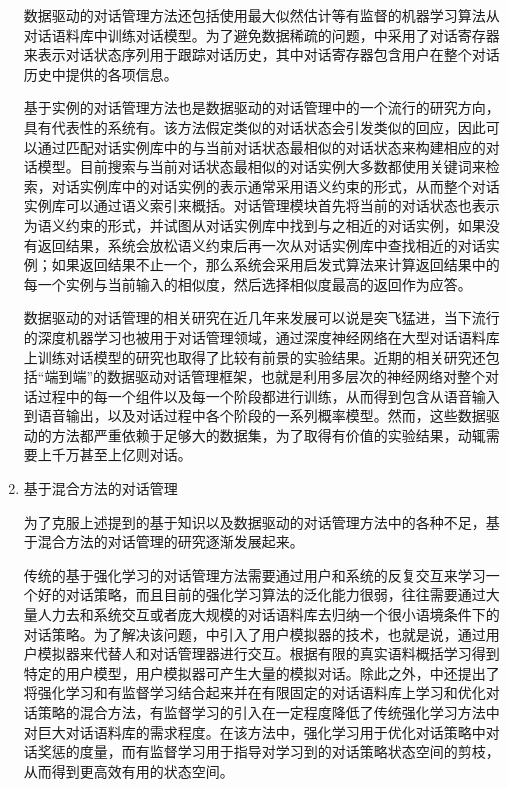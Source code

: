 \begin{enumerate}
数据驱动的对话管理方法还包括使用最大似然估计等有监督的机器学习算法从对话语料库中训练对话模型\cite{Hurtado2005}。为了避免数据稀疏的问题，\cite{Hurtado2005}中采用了对话寄存器来表示对话状态序列用于跟踪对话历史，其中对话寄存器包含用户在整个对话历史中提供的各项信息。

基于实例的对话管理方法也是数据驱动的对话管理中的一个流行的研究方向，具有代表性的系统有\cite{Murao2003, Inui2001, Lee2009c}。该方法假定类似的对话状态会引发类似的回应，因此可以通过匹配对话实例库中的与当前对话状态最相似的对话状态来构建相应的对话模型。目前搜索与当前对话状态最相似的对话实例大多数都使用关键词来检索，对话实例库中的对话实例的表示通常采用语义约束的形式，从而整个对话实例库可以通过语义索引来概括\cite{Lee2009c}。对话管理模块首先将当前的对话状态也表示为语义约束的形式，并试图从对话实例库中找到与之相近的对话实例，如果没有返回结果，系统会放松语义约束后再一次从对话实例库中查找相近的对话实例；如果返回结果不止一个，那么系统会采用启发式算法来计算返回结果中的每一个实例与当前输入的相似度，然后选择相似度最高的返回作为应答。

数据驱动的对话管理的相关研究在近几年来发展可以说是突飞猛进，当下流行的深度机器学习也被用于对话管理领域，通过深度神经网络在大型对话语料库上训练对话模型的研究也取得了比较有前景的实验结果\cite{Shang2015, Sordoni2015b, VinyalsLe2015}。近期的相关研究还包括“端到端”的数据驱动对话管理框架，也就是利用多层次的神经网络对整个对话过程中的每一个组件以及每一个阶段都进行训练，从而得到包含从语音输入到语音输出，以及对话过程中各个阶段的一系列概率模型\cite{Serban2015}。然而，这些数据驱动的方法都严重依赖于足够大的数据集，为了取得有价值的实验结果，动辄需要上千万甚至上亿则对话。

\item 基于混合方法的对话管理

为了克服上述提到的基于知识以及数据驱动的对话管理方法中的各种不足，基于混合方法的对话管理的研究逐渐发展起来。

传统的基于强化学习的对话管理方法需要通过用户和系统的反复交互来学习一个好的对话策略，而且目前的强化学习算法的泛化能力很弱，往往需要通过大量人力去和系统交互或者庞大规模的对话语料库去归纳一个很小语境条件下的对话策略。为了解决该问题，\cite{Pietquin2006, Schatzmann2007}中引入了用户模拟器的技术，也就是说，通过用户模拟器来代替人和对话管理器进行交互。根据有限的真实语料概括学习得到特定的用户模型，用户模拟器可产生大量的模拟对话。除此之外，中还提出了将强化学习和有监督学习结合起来并在有限固定的对话语料库上学习和优化对话策略的混合方法，有监督学习的引入在一定程度降低了传统强化学习方法中对巨大对话语料库的需求程度。在该方法中，强化学习用于优化对话策略中对话奖惩的度量，而有监督学习用于指导对学习到的对话策略状态空间的剪枝，从而得到更高效有用的状态空间。


\end{enumerate}
